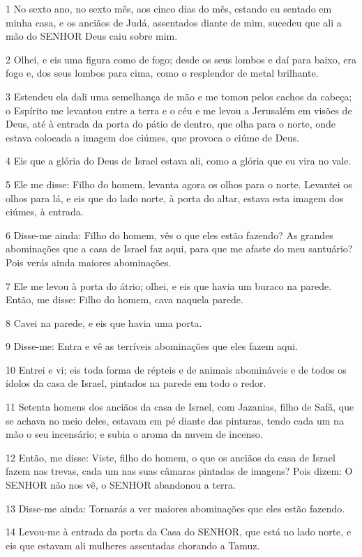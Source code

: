 \par 1 No sexto ano, no sexto mês, aos cinco dias do mês, estando eu sentado em minha casa, e os anciãos de Judá, assentados diante de mim, sucedeu que ali a mão do SENHOR Deus caiu sobre mim.
\par 2 Olhei, e eis uma figura como de fogo; desde os seus lombos e daí para baixo, era fogo e, dos seus lombos para cima, como o resplendor de metal brilhante.
\par 3 Estendeu ela dali uma semelhança de mão e me tomou pelos cachos da cabeça; o Espírito me levantou entre a terra e o céu e me levou a Jerusalém em visões de Deus, até à entrada da porta do pátio de dentro, que olha para o norte, onde estava colocada a imagem dos ciúmes, que provoca o ciúme de Deus.
\par 4 Eis que a glória do Deus de Israel estava ali, como a glória que eu vira no vale.
\par 5 Ele me disse: Filho do homem, levanta agora os olhos para o norte. Levantei os olhos para lá, e eis que do lado norte, à porta do altar, estava esta imagem dos ciúmes, à entrada.
\par 6 Disse-me ainda: Filho do homem, vês o que eles estão fazendo? As grandes abominações que a casa de Israel faz aqui, para que me afaste do meu santuário? Pois verás ainda maiores abominações.
\par 7 Ele me levou à porta do átrio; olhei, e eis que havia um buraco na parede. Então, me disse: Filho do homem, cava naquela parede.
\par 8 Cavei na parede, e eis que havia uma porta.
\par 9 Disse-me: Entra e vê as terríveis abominações que eles fazem aqui.
\par 10 Entrei e vi; eis toda forma de répteis e de animais abomináveis e de todos os ídolos da casa de Israel, pintados na parede em todo o redor.
\par 11 Setenta homens dos anciãos da casa de Israel, com Jazanias, filho de Safã, que se achava no meio deles, estavam em pé diante das pinturas, tendo cada um na mão o seu incensário; e subia o aroma da nuvem de incenso.
\par 12 Então, me disse: Viste, filho do homem, o que os anciãos da casa de Israel fazem nas trevas, cada um nas suas câmaras pintadas de imagens? Pois dizem: O SENHOR não nos vê, o SENHOR abandonou a terra.
\par 13 Disse-me ainda: Tornarás a ver maiores abominações que eles estão fazendo.
\par 14 Levou-me à entrada da porta da Casa do SENHOR, que está no lado norte, e eis que estavam ali mulheres assentadas chorando a Tamuz.
